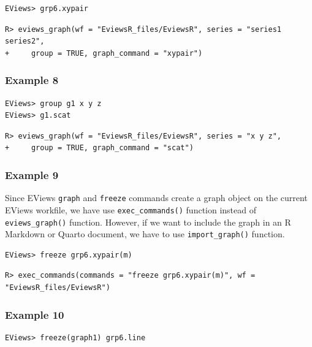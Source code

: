 \begin{verbatim}
EViews> grp6.xypair
\end{verbatim}

\begin{verbatim}
R> eviews_graph(wf = "EviewsR_files/EviewsR", series = "series1 series2",
+     group = TRUE, graph_command = "xypair")
\end{verbatim}

\hypertarget{example-8}{%
\subsubsection{Example 8}\label{example-8}}

\begin{verbatim}
EViews> group g1 x y z
EViews> g1.scat
\end{verbatim}

\begin{verbatim}
R> eviews_graph(wf = "EviewsR_files/EviewsR", series = "x y z",
+     group = TRUE, graph_command = "scat")
\end{verbatim}

\hypertarget{example-9}{%
\subsubsection{Example 9}\label{example-9}}

Since EViews \texttt{graph} and \texttt{freeze} commands create a graph object on the current EViews workfile, we have use \texttt{exec\_commands()} function instead of \texttt{eviews\_graph()} function. However, if we want to include the graph in an R Markdown or Quarto document, we have to use \texttt{import\_graph()} function.

\begin{verbatim}
EViews> freeze grp6.xypair(m)
\end{verbatim}

\begin{verbatim}
R> exec_commands(commands = "freeze grp6.xypair(m)", wf = "EviewsR_files/EviewsR")
\end{verbatim}

\hypertarget{example-10}{%
\subsubsection{Example 10}\label{example-10}}

\begin{verbatim}
EViews> freeze(graph1) grp6.line
\end{verbatim}


